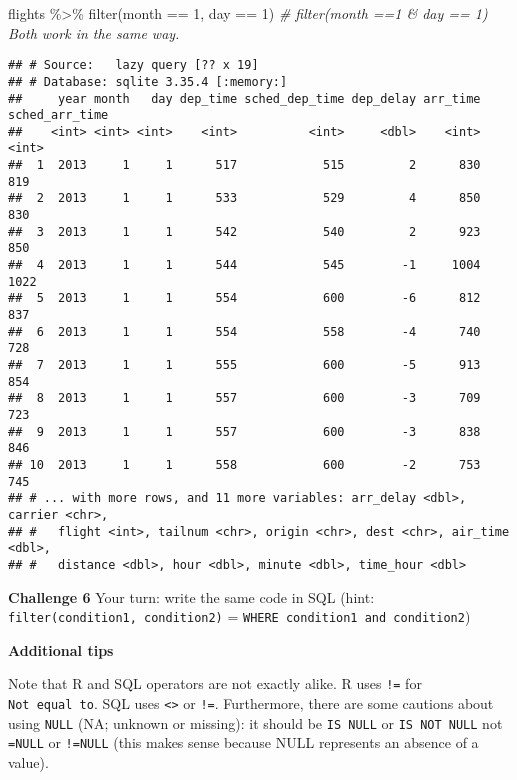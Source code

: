 \documentclass[
]{book}
\newenvironment{Shaded}{\begin{snugshade}}{\end{snugshade}}
\newcommand{\CommentTok}[1]{\textcolor[rgb]{0.56,0.35,0.01}{\textit{#1}}}
\newcommand{\DecValTok}[1]{\textcolor[rgb]{0.00,0.00,0.81}{#1}}
\newcommand{\FunctionTok}[1]{\textcolor[rgb]{0.00,0.00,0.00}{#1}}
\newcommand{\NormalTok}[1]{#1}
\newcommand{\SpecialCharTok}[1]{\textcolor[rgb]{0.00,0.00,0.00}{#1}}
\begin{document}
\begin{Shaded}
\begin{Highlighting}[]
\NormalTok{flights }\SpecialCharTok{\%\textgreater{}\%} 
  \FunctionTok{filter}\NormalTok{(month }\SpecialCharTok{==} \DecValTok{1}\NormalTok{, day }\SpecialCharTok{==} \DecValTok{1}\NormalTok{) }\CommentTok{\# filter(month ==1 \& day == 1) Both work in the same way.}
\end{Highlighting}
\end{Shaded}

\begin{verbatim}
## # Source:   lazy query [?? x 19]
## # Database: sqlite 3.35.4 [:memory:]
##     year month   day dep_time sched_dep_time dep_delay arr_time sched_arr_time
##    <int> <int> <int>    <int>          <int>     <dbl>    <int>          <int>
##  1  2013     1     1      517            515         2      830            819
##  2  2013     1     1      533            529         4      850            830
##  3  2013     1     1      542            540         2      923            850
##  4  2013     1     1      544            545        -1     1004           1022
##  5  2013     1     1      554            600        -6      812            837
##  6  2013     1     1      554            558        -4      740            728
##  7  2013     1     1      555            600        -5      913            854
##  8  2013     1     1      557            600        -3      709            723
##  9  2013     1     1      557            600        -3      838            846
## 10  2013     1     1      558            600        -2      753            745
## # ... with more rows, and 11 more variables: arr_delay <dbl>, carrier <chr>,
## #   flight <int>, tailnum <chr>, origin <chr>, dest <chr>, air_time <dbl>,
## #   distance <dbl>, hour <dbl>, minute <dbl>, time_hour <dbl>
\end{verbatim}

\textbf{Challenge 6}
Your turn: write the same code in SQL (hint: \texttt{filter(condition1,\ condition2)} = \texttt{WHERE\ condition1\ and\ condition2})

\textbf{Additional tips}

Note that R and SQL operators are not exactly alike. R uses \texttt{!=} for \texttt{Not\ equal\ to}. SQL uses \texttt{\textless{}\textgreater{}} or \texttt{!=}. Furthermore, there are some cautions about using \texttt{NULL} (NA; unknown or missing): it should be \texttt{IS\ NULL} or \texttt{IS\ NOT\ NULL} not \texttt{=NULL} or \texttt{!=NULL} (this makes sense because NULL represents an absence of a value).
\end{document}
